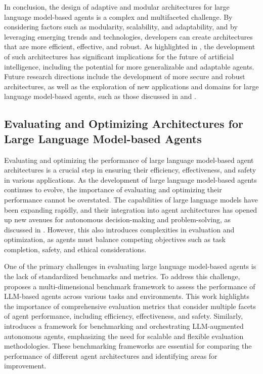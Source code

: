 \documentclass[11pt,a4paper]{article}
\begin{document}
In conclusion, the design of adaptive and modular architectures for large language model-based agents is a complex and multifaceted challenge. By considering factors such as modularity, scalability, and adaptability, and by leveraging emerging trends and technologies, developers can create architectures that are more efficient, effective, and robust. As highlighted in \cite{arxiv:2406.04151}, the development of such architectures has significant implications for the future of artificial intelligence, including the potential for more generalizable and adaptable agents. Future research directions include the development of more secure and robust architectures, as well as the exploration of new applications and domains for large language model-based agents, such as those discussed in \cite{doi:10.22214/ijraset.2023.54677} and \cite{doi:10.1109/mwc.016.2300600}.


\subsection{Evaluating and Optimizing Architectures for Large Language Model-based Agents}


Evaluating and optimizing the performance of large language model-based agent architectures is a crucial step in ensuring their efficiency, effectiveness, and safety in various applications. As the development of large language model-based agents continues to evolve, the importance of evaluating and optimizing their performance cannot be overstated. The capabilities of large language models have been expanding rapidly, and their integration into agent architectures has opened up new avenues for autonomous decision-making and problem-solving, as discussed in \cite{arxiv:2206.07682}. However, this also introduces complexities in evaluation and optimization, as agents must balance competing objectives such as task completion, safety, and ethical considerations.

One of the primary challenges in evaluating large language model-based agents is the lack of standardized benchmarks and metrics. To address this challenge, \cite{arxiv:2308.03688} proposes a multi-dimensional benchmark framework to assess the performance of LLM-based agents across various tasks and environments. This work highlights the importance of comprehensive evaluation metrics that consider multiple facets of agent performance, including efficiency, effectiveness, and safety. Similarly, \cite{arxiv:2308.05960} introduces a framework for benchmarking and orchestrating LLM-augmented autonomous agents, emphasizing the need for scalable and flexible evaluation methodologies. These benchmarking frameworks are essential for comparing the performance of different agent architectures and identifying areas for improvement.
\end{document}
